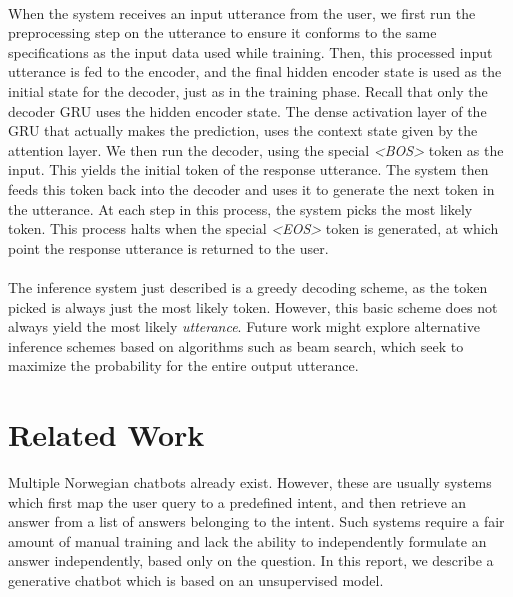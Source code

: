 \documentclass{article}
\begin{document}
\paragraph{}
When the system receives an input utterance from the user, we first run the
preprocessing step on the utterance to ensure it conforms to the same
specifications as the input data used while training. Then, this processed
input utterance is fed to the encoder, and the final hidden encoder state is
used as the initial state for the decoder, just as in the training phase.
Recall that only the decoder GRU uses the hidden encoder state. The dense
activation layer of the GRU that actually makes the prediction, uses the
context state given by the attention layer. We then run the decoder, using the
special \emph{<BOS>} token as the input.  This yields the initial token of the
response utterance. The system then feeds this token back into the decoder and
uses it to generate the next token in the utterance. At each step in this
process, the system picks the most likely token. This process halts when the
special \emph{<EOS>} token is generated, at which point the response utterance
is returned to the user.

\paragraph{}
The inference system just described is a greedy decoding scheme, as the token
picked is always just the most likely token. However, this basic scheme does
not always yield the most likely \emph{utterance}. Future work might explore
alternative inference schemes based on algorithms such as beam search, which
seek to maximize the probability for the entire output utterance.


\section*{Related Work}
Multiple Norwegian chatbots already exist. However, these are usually systems
which first map the user query to a predefined intent, and then retrieve an
answer from a list of answers belonging to the intent. Such systems require a
fair amount of manual training and lack the ability to independently formulate
an answer independently, based only on the question.  In this report, we
describe a generative chatbot which is based on an unsupervised model.
\end{document}
